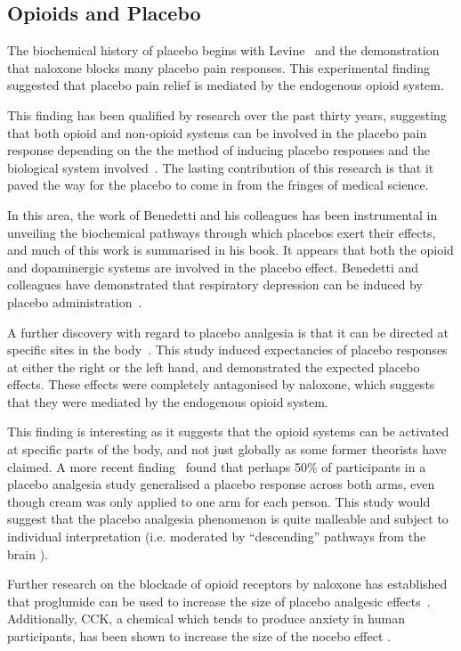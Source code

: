 \subsection{Opioids and Placebo}
\label{sec:opiods-placebo}

The biochemical history of placebo begins with Levine~\cite{Levine1978a} and the demonstration that naloxone blocks many placebo pain responses. This experimental finding suggested that placebo pain relief is mediated by the endogenous opioid system. 

This finding has been qualified by research over the past thirty years, suggesting that both opioid and non-opioid systems can be involved in the placebo pain response depending on the the method of inducing placebo responses and the biological system involved~\cite{Amanzio2001,benedetti2003a}. The lasting contribution of this research is that it paved the way for the placebo to come in from the fringes of medical science.

In this area, the work of Benedetti and his colleagues has been instrumental in unveiling the biochemical pathways through which placebos exert their effects, and much of this work is summarised in his book.  It appears that both the opioid and dopaminergic systems are involved in the placebo effect.  Benedetti and colleagues have demonstrated that respiratory depression can be induced by placebo administration~\cite{Benedetti1999a}. 

A further discovery with regard to placebo analgesia is that it can be directed at specific sites in the body~\cite{Benedetti1999}. This study induced expectancies of placebo responses at either the right or the left hand, and demonstrated the expected placebo effects. These effects were completely antagonised by naloxone, which suggests that they were mediated by the endogenous opioid system. 

This finding is interesting as it suggests that the opioid systems can be activated at specific parts of the body, and not just globally as some former theorists have claimed. A more recent finding~\cite{Watson2006} found that perhaps 50\% of participants in a placebo analgesia study generalised a placebo response across both arms, even though cream was only applied to one arm for each person. 
This study would suggest that the placebo analgesia phenomenon is quite malleable and subject to individual interpretation (i.e. moderated by ``descending'' pathways from the brain \cite{Goffaux2007}). 

Further research on the blockade of opioid receptors by naloxone has established that proglumide can be used to increase the size of placebo analgesic effects~\cite{Benedetti1995}. Additionally, CCK, a chemical which tends to produce anxiety in human participants, has been shown to increase the size of the nocebo effect \cite{Benedetti1996}. 

